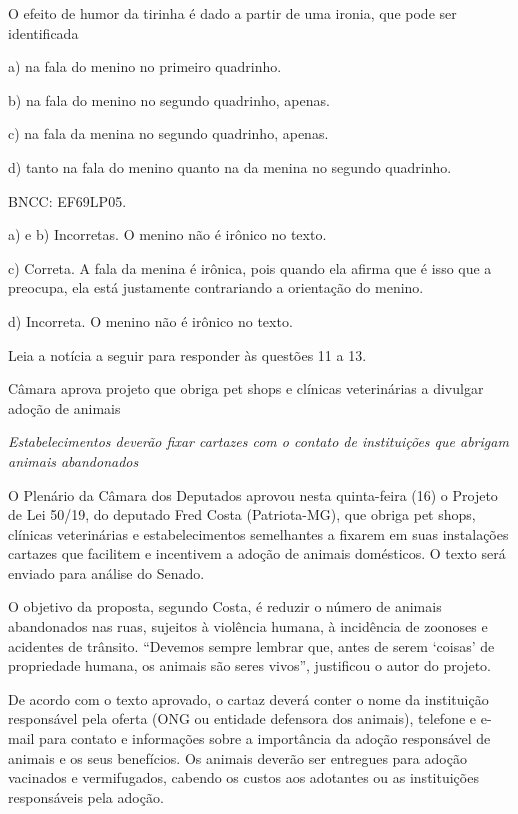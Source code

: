 
O efeito de humor da tirinha é dado a partir de uma ironia, que pode ser
identificada

a) na fala do menino no primeiro quadrinho.

b) na fala do menino no segundo quadrinho, apenas.

c) na fala da menina no segundo quadrinho, apenas.

d) tanto na fala do menino quanto na da menina no segundo quadrinho.

BNCC: EF69LP05.

a) e b) Incorretas. O menino não é irônico no texto.

c) Correta. A fala da menina é irônica, pois quando ela afirma que é
isso que a preocupa, ela está justamente contrariando a orientação do
menino.

d) Incorreta. O menino não é irônico no texto.

Leia a notícia a seguir para responder às questões 11 a 13.

Câmara aprova projeto que obriga pet shops e clínicas veterinárias a
divulgar adoção de animais

\emph{Estabelecimentos deverão fixar cartazes com o contato de
instituições que abrigam animais abandonados}

O Plenário da Câmara dos Deputados aprovou nesta quinta-feira (16) o
Projeto de Lei 50/19, do deputado Fred Costa (Patriota-MG), que obriga
pet shops, clínicas veterinárias e estabelecimentos semelhantes a
fixarem em suas instalações cartazes que facilitem e incentivem a adoção
de animais domésticos. O texto será enviado para análise do Senado.

O objetivo da proposta, segundo Costa, é reduzir o número de animais
abandonados nas ruas, sujeitos à violência humana, à incidência de
zoonoses e acidentes de trânsito. ``Devemos sempre lembrar que, antes de
serem `coisas' de propriedade humana, os animais são seres vivos'',
justificou o autor do projeto.

De acordo com o texto aprovado, o cartaz deverá conter o nome da
instituição responsável pela oferta (ONG ou entidade defensora dos
animais), telefone e e-mail para contato e informações sobre a
importância da adoção responsável de animais e os seus benefícios. Os
animais deverão ser entregues para adoção vacinados e vermifugados,
cabendo os custos aos adotantes ou as instituições responsáveis pela
adoção.

